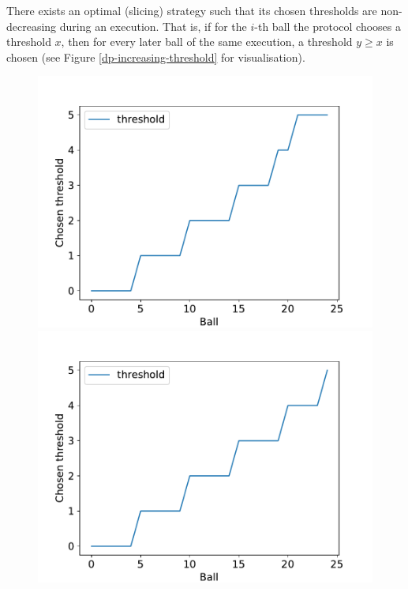 \begin{conjecture}\label{conjecture: two-thinning-increasing-threshold}
There exists an optimal (slicing) strategy such that its chosen thresholds are non-decreasing during an execution. That is, if for the $i$-th ball the protocol chooses a threshold $x$, then for every later ball of the same execution, a threshold $y\geq x$ is chosen (see Figure \ref{dp-increasing-threshold} for visualisation).
\end{conjecture}


\begin{figure}
\centering
\begin{minipage}[t]{.32\linewidth}
  \centering
  \includegraphics[scale=0.36]{Chapter4/Figs/dp_increasing_threshold_1.pdf}
\end{minipage}\hfill
\begin{minipage}[t]{.32\linewidth}
  \centering
  \includegraphics[scale=0.36]{Chapter4/Figs/dp_increasing_threshold_2.pdf}

\end{minipage}
\end{figure}
